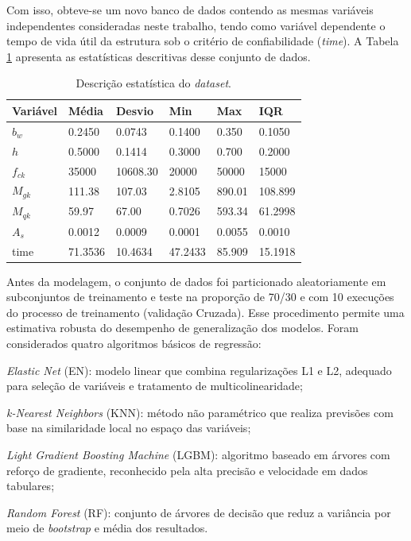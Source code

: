 Com isso, obteve-se um novo banco de dados contendo as mesmas variáveis independentes consideradas neste trabalho, tendo como variável dependente o tempo de vida útil da estrutura sob o critério de confiabilidade (\textit{time}). A Tabela \ref{tab:desc_stats} apresenta as estatísticas descritivas desse conjunto de dados.

\begin{table}[H]
\centering
\caption{Descrição estatística do \textit{dataset}.}
\label{tab:desc_stats}
\begin{tabular}{l lllll}
\hline
Variável & Média & Desvio & Min & Max & IQR \\
\hline
$b_w$       & 0.2450  & 0.0743      & 0.1400 & 0.350  & 0.1050 \\
$h$       & 0.5000  & 0.1414      & 0.3000 & 0.700  & 0.2000 \\
$f_{ck}$     & 35000   & 10608.30  & 20000  & 50000  & 15000  \\
$M_{gk}$     & 111.38 & 107.03   & 2.8105 & 890.01 & 108.899 \\
$M_{qk}$     & 59.97  & 67.00    & 0.7026 & 593.34 & 61.2998 \\
$A_s$      & 0.0012  & 0.0009      & 0.0001 & 0.0055 & 0.0010 \\
time    & 71.3536  & 10.4634    & 47.2433 & 85.909 & 15.1918 \\
\hline
\end{tabular}
\end{table}

Antes da modelagem, o conjunto de dados foi particionado aleatoriamente em subconjuntos de treinamento e teste na proporção de 70/30 e com 10 execuções do processo de treinamento (validação Cruzada). Esse procedimento permite uma estimativa robusta do desempenho de generalização dos modelos. Foram considerados quatro algoritmos básicos de regressão:

\begin{alineas}
\item \textit{Elastic Net} (EN): modelo linear que combina regularizações L1 e L2, adequado para seleção de variáveis e tratamento de multicolinearidade; 

\item \textit{k-Nearest Neighbors} (KNN): método não paramétrico que realiza previsões com base na similaridade local no espaço das variáveis; 

\item \textit{Light Gradient Boosting Machine} (LGBM): algoritmo baseado em árvores com reforço de gradiente, reconhecido pela alta precisão e velocidade em dados tabulares; 

\item \textit{Random Forest} (RF): conjunto de árvores de decisão que reduz a variância por meio de \textit{bootstrap} e média dos resultados. 
\end{alineas}

